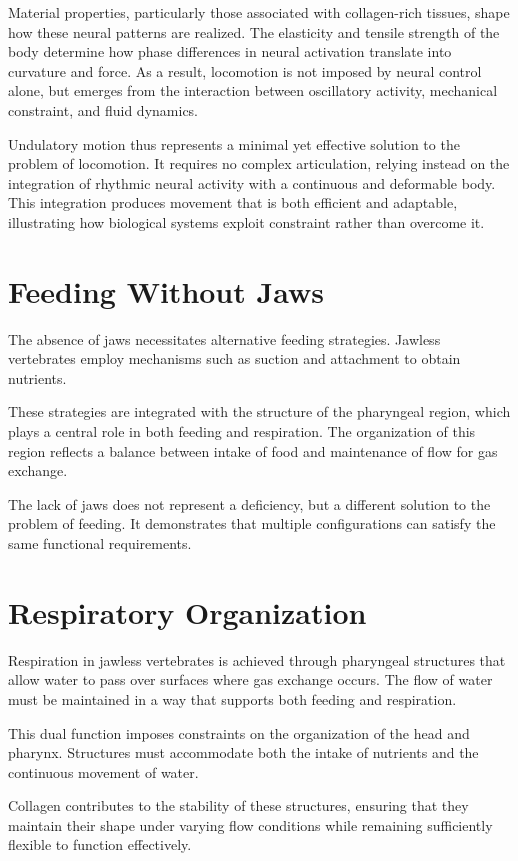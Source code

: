 \documentclass[11pt,oneside]{book}
\begin{document}
Material properties, particularly those associated with collagen-rich tissues, shape how these neural patterns are realized. The elasticity and tensile strength of the body determine how phase differences in neural activation translate into curvature and force. As a result, locomotion is not imposed by neural control alone, but emerges from the interaction between oscillatory activity, mechanical constraint, and fluid dynamics.

Undulatory motion thus represents a minimal yet effective solution to the problem of locomotion. It requires no complex articulation, relying instead on the integration of rhythmic neural activity with a continuous and deformable body. This integration produces movement that is both efficient and adaptable, illustrating how biological systems exploit constraint rather than overcome it.

\section{Feeding Without Jaws}

The absence of jaws necessitates alternative feeding strategies. Jawless vertebrates employ mechanisms such as suction and attachment to obtain nutrients.

These strategies are integrated with the structure of the pharyngeal region, which plays a central role in both feeding and respiration. The organization of this region reflects a balance between intake of food and maintenance of flow for gas exchange.

The lack of jaws does not represent a deficiency, but a different solution to the problem of feeding. It demonstrates that multiple configurations can satisfy the same functional requirements.

\section{Respiratory Organization}

Respiration in jawless vertebrates is achieved through pharyngeal structures that allow water to pass over surfaces where gas exchange occurs. The flow of water must be maintained in a way that supports both feeding and respiration.

This dual function imposes constraints on the organization of the head and pharynx. Structures must accommodate both the intake of nutrients and the continuous movement of water.

Collagen contributes to the stability of these structures, ensuring that they maintain their shape under varying flow conditions while remaining sufficiently flexible to function effectively.
\end{document}
